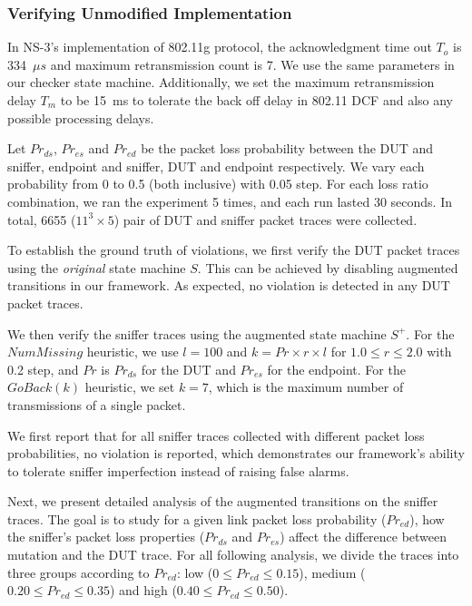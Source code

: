 \subsubsection{Verifying Unmodified Implementation}

In NS-3's implementation of 802.11g protocol, the acknowledgment time out $T_o$
is 334~$\mu s$ and maximum retransmission count is 7.
%
We use the same parameters in our checker state machine.
%
Additionally, we set the maximum retransmission delay $T_m$ to be 15~ms to
tolerate the back off delay in 802.11 DCF and also any possible processing
delays.


Let $Pr_{ds}$, $Pr_{es}$ and $Pr_{ed}$ be the packet loss probability between
the DUT and sniffer, endpoint and sniffer, DUT and endpoint respectively.
%
We vary each probability from 0 to 0.5 (both inclusive) with 0.05
step.
%
For each loss ratio combination, we ran the experiment 5 times, and each run lasted 30 seconds.
%
In total, 6655 ($11^3\times 5$) pair of DUT and sniffer packet traces were
collected.

To establish the ground truth of violations, we first verify the DUT packet
traces using the \textit{original} state machine $S$.
%
This can be achieved by
disabling augmented transitions in our framework.
%
As expected, no violation is
detected in any DUT packet traces.

We then verify the sniffer traces using the augmented state machine $S^+$.
%
For the $NumMissing$ heuristic, we use $l=100$ and $k=Pr\times r\times l$ for $1.0 \le r \le 2.0$
with 0.2 step, and $Pr$ is $Pr_{ds}$ for the DUT and $Pr_{es}$ for the endpoint.
%
For the $GoBack(k)$ heuristic, we set $k=7$, which is the maximum number of transmissions
of a single packet.
%

We first report that for all sniffer traces collected with different packet loss
probabilities, no violation is reported, which demonstrates our framework's
ability to tolerate sniffer imperfection instead of raising false alarms.

Next, we present detailed analysis of the augmented transitions on the sniffer
traces.
%
The goal is to study for a given link packet loss probability ($Pr_{ed}$), how
the sniffer's packet loss properties ($Pr_{ds}$ and $Pr_{es}$) affect the
difference between mutation and the DUT trace.
%
For all following analysis, we divide the traces into three groups according to
$Pr_{ed}$: low ($0 \le Pr_{ed} \le 0.15$), medium
($0.20 \le Pr_{ed} \le 0.35$) and high ($0.40 \le Pr_{ed} \le 0.50$).

